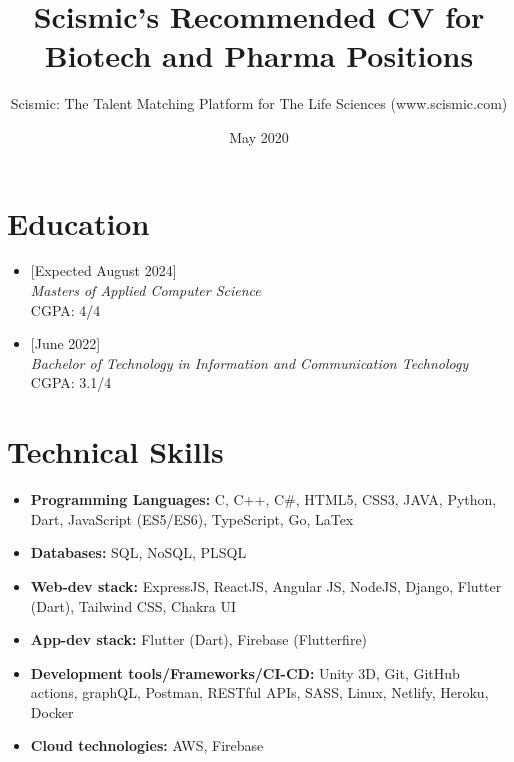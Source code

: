 \documentclass{article}
\title{Scismic's Recommended CV for Biotech and Pharma Positions}
\author{Scismic: The Talent Matching Platform for The Life Sciences (www.scismic.com)}
\date{May 2020}
\begin{document}

\makecvtitle %

\section{Education}
\begin{itemize}

\item
{}[Expected August 2024]
\\\textit{Masters of Applied Computer Science}
\\
CGPA: 4/4
\item
{}[June 2022]
\\\textit{Bachelor of Technology in Information and Communication Technology}
\\
CGPA: 3.1/4

\end{itemize}
 
\section{Technical Skills}

\begin{itemize}
\item \textbf{Programming Languages:} C, C++, C\#, HTML5, CSS3, JAVA, Python, Dart, JavaScript (ES5/ES6), TypeScript, Go, LaTex
\item \textbf{Databases:} SQL, NoSQL, PLSQL
\item \textbf{Web-dev stack:} ExpressJS, ReactJS, Angular JS, NodeJS, Django, Flutter (Dart), Tailwind CSS, Chakra UI
\item \textbf{App-dev stack:} Flutter (Dart), Firebase (Flutterfire)
\item \textbf{Development tools/Frameworks/CI-CD:} Unity 3D, Git, GitHub actions, graphQL, Postman, RESTful APIs, SASS, Linux, Netlify, Heroku, Docker
\item \textbf{Cloud technologies:} AWS, Firebase

\end{itemize}
\end{document}
